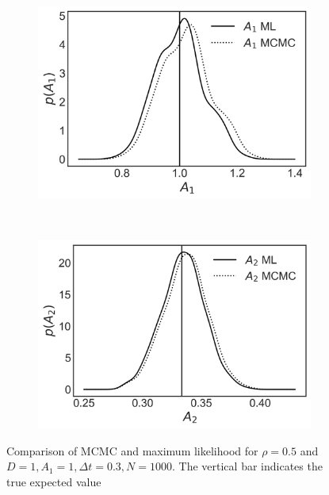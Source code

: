 \documentclass[%
 reprint,
 amsmath,amssymb,
 aps,
]{revtex4-1}
\begin{document}
\begin{figure}[H]
    \centering
    \begin{subfigure}[b]{0.4\textwidth}
        \includegraphics[width=\textwidth]{A1kde05.png}
        \label{fig:A1rho05}
    \end{subfigure}
    ~ %
    \begin{subfigure}[b]{0.4\textwidth}
        \includegraphics[width=\textwidth]{A2kde05.png}
        \label{fig:A2rho05}
    \end{subfigure}
    \caption{Comparison of MCMC and maximum likelihood for $\rho=0.5$ and $D=1,A_{1}=1,\Delta t = 0.3,N=1000$.  The vertical bar indicates the true expected value}\label{fig:Arho05}
\end{figure}
\end{document}
